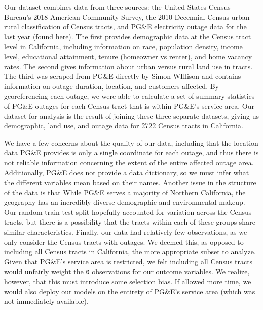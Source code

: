 \documentclass[
]{article}
\begin{document}
Our dataset combines data from three sources: the United States Census
Bureau's 2018 American Community Survey, the 2010 Decennial Census
urban-rural classification of Census tracts, and PG\&E electricity
outage data for the last year (found
\href{https://simonwillison.net/2019/Oct/10/pge-outages/}{here}). The
first provides demographic data at the Census tract level in California,
including information on race, population density, income level,
educational attainment, tenure (homeowner vs renter), and home vacancy
rates. The second gives information about urban versus rural land use in
tracts. The third was scraped from PG\&E directly by Simon WIllison and
contains information on outage duration, location, and customers
affected. By georeferencing each outage, we were able to calculate a set
of summary statistics of PG\&E outages for each Census tract that is
within PG\&E's service area. Our dataset for analysis is the result of
joining these three separate datasets, giving us demographic, land use,
and outage data for 2722 Census tracts in California.

We have a few concerns about the quality of our data, including that the
location data PG\&E provides is only a single coordinate for each
outage, and thus there is not reliable information concerning the extent
of the entire affected outage area. Additionally, PG\&E does not provide
a data dictionary, so we must infer what the different variables mean
based on their names. Another issue in the structure of the data is that
While PG\&E serves a majority of Northern California, the geography has
an incredibly diverse demographic and environmental makeup. Our random
train-test split hopefully accounted for variation across the Census
tracts, but there is a possibility that the tracts within each of these
groups share similar characteristics. Finally, our data had relatively
few observations, as we only consider the Census tracts with outages. We
deemed this, as opposed to including all Census tracts in California,
the more appropriate subset to analyze. Given that PG\&E's service area
is restricted, we felt including all Census tracts would unfairly weight
the \texttt{0} observations for our outcome variables. We realize,
however, that this must introduce some selection bias. If allowed more
time, we would also deploy our models on the entirety of PG\&E's service
area (which was not immediately available).
\end{document}
